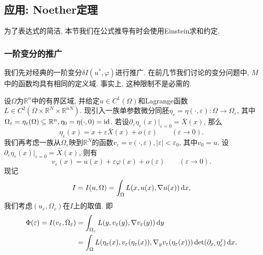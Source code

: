 \documentclass[12pt,a4paper]{article}
\begin{document}
\subsection{应用: Noether定理}

为了表达式的简洁, 本节我们在公式推导有时会使用Einstein求和约定.

\subsubsection{一阶变分的推广}

我们先对经典的一阶变分$\delta I(u^*, \varphi)$进行推广. 在前几节我们讨论的变分问题中, $M$中的函数均具有相同的定义域.
事实上, 这种限制不是必需的.

设$\Omega$为$\mathbb{R}^n$中的有界区域, 并给定$u \in C^1(\Omega)$和Lagrange函数$L \in C^2(\overline{\Omega} \times \mathbb{R}^N \times \mathbb{R}^{nN})$.
现引入一族单参数微分同胚$\eta_{\varepsilon} = \eta(\cdot, \varepsilon)\colon \Omega \rightarrow \Omega_{\varepsilon}$,  其中$\Omega_{\varepsilon} = \eta_{\varepsilon}(\Omega) \subseteq \mathbb{R}^n, \eta_0 = \eta( \cdot, 0) = {\rm id}$.
若设$\partial_{\varepsilon}\eta_{\varepsilon}(x)|_{\varepsilon = 0} = \bar{X}(x)$, 那么
\begin{equation}\label{25}
    \eta_{\varepsilon}(x) = x + \varepsilon\bar{X}(x) + o(\varepsilon) \qquad (\varepsilon \rightarrow 0).
\end{equation}
我们再考虑一族从$\Omega_{\varepsilon}$映到$\mathbb{R}^N$的函数$v_{\varepsilon} = v( \cdot, \varepsilon), |\varepsilon| < \varepsilon_0$, 其中$v_0 = u$.
设$\partial_{\varepsilon}\eta_{\varepsilon}(x)|_{\varepsilon = 0} = \bar{X}(x)$, 则有
\begin{equation*}
    v_{\varepsilon}(x) = u(x) + \varepsilon\varphi(x) + o(\varepsilon) \qquad (\varepsilon \rightarrow 0).
\end{equation*}
现记 
\begin{equation*}
    I = I(u, \Omega) = \int_{\Omega}L(x,u(x), \nabla u(x)) \,{\rm d}x,
\end{equation*}
我们考虑$(u_{\varepsilon}, \Omega_{\varepsilon})$在$I$上的取值. 即
\begin{align*}
    \Phi(\varepsilon) = I(v_{\varepsilon}, \Omega_{\varepsilon}) &= \int_{\Omega_{\varepsilon}}L(y, v_{\varepsilon}(y), \nabla v_{\varepsilon}(y)) \,{\rm d}y \\
    &= \int_{\Omega}L(\eta_{\varepsilon}(x), v_{\varepsilon}(\eta_{\varepsilon}(x)), \nabla_y v_{\varepsilon}(\eta_{\varepsilon}(x))) \det(\partial_{x_i}\eta_{\varepsilon}^j) \,{\rm d}x.
\end{align*} 
\end{document}
